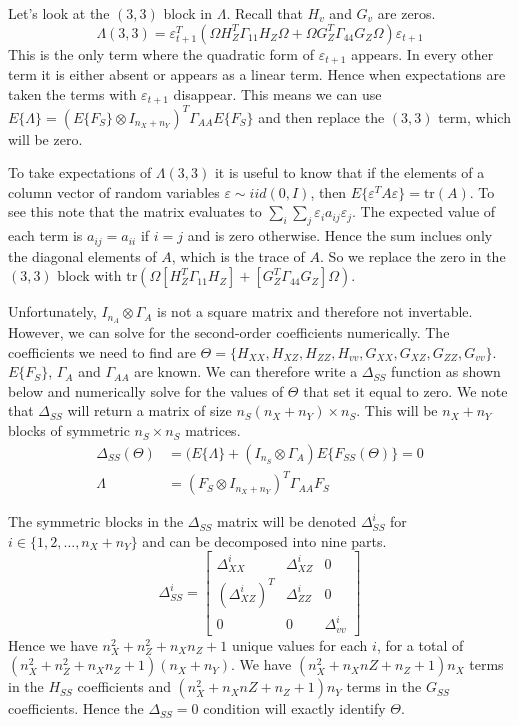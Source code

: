 \documentclass[letterpaper,12pt]{article}
\newcommand{\ve}{\varepsilon}
\theoremstyle{definition}
\begin{document}
\begin{spacing}{1.5}
		Let's look at the $(3,3)$ block in $\Lambda$.  Recall that $H_v$ and $G_v$ are zeros.
		\begin{equation}
			\Lambda(3,3) = \ve_{t+1}^T (\Omega H_Z^T \Gamma_{11} H_Z \Omega + \Omega G_Z^T \Gamma_{44} G_Z \Omega)  \ve_{t+1} \nonumber
		\end{equation}
		This is the only term where the quadratic form of $\ve_{t+1}$ appears.  In every other term it is either absent or appears as a linear term.  Hence when expectations are taken the terms with $\ve_{t+1}$ disappear.  This means we can use $E\{\Lambda\} = (E\{F_S\} \otimes I_{n_X+n_Y})^T \Gamma_{AA} E\{F_S\}$ and then replace the $(3,3)$ term, which will be zero.

		To take expectations of $\Lambda(3,3)$ it is useful to know that if the elements of a column vector of random variables $\ve \sim iid(0,I)$, then $E\{ \ve^T A \ve \} = \text{tr}(A)$.  To see this note that the matrix evaluates to $\sum_i \sum_j \ve_i a_{ij} \ve_j$.  The expected value of each term is $a_{ij} = a_{ii}$ if $i=j$ and is zero otherwise.  Hence the sum inclues only the diagonal elements of $A$, which is the trace of $A$.  So we replace the zero in the $(3,3)$ block with $\text{tr}(\Omega [H_Z^T \Gamma_{11} H_Z] + [G_Z^T \Gamma_{44} G_Z] \Omega)$.
		

		Unfortunately, $I_{n_A} \otimes \Gamma_A$ is not a square matrix and therefore not invertable.  However, we can solve for the second-order coefficients numerically.  The coefficients we need to find are $\Theta = \{ H_{XX}, H_{XZ}, H_{ZZ}, H_{vv}, G_{XX}, G_{XZ}, G_{ZZ}, G_{vv} \}$.  $E\{F_S\}$, $\Gamma_A$ and $\Gamma_{AA}$ are known.  We can therefore write a $\Delta_{SS}$ function as shown below and numerically solve for the values of $\Theta$ that set it equal to zero.  We note that $\Delta_{SS}$ will return a matrix of size $n_S(n_X+n_Y) \times n_S$.  This will be $n_X+n_Y$ blocks of symmetric $n_S \times n_S$ matrices.
		\begin{align}
			\Delta_{SS}(\Theta) & = (E\{\Lambda\} + (I_{n_S} \otimes \Gamma_A) E\{F_{SS}(\Theta)\}  = 0 \nonumber \\
			\Lambda & = (F_S \otimes I_{n_X+n_Y})^T \Gamma_{AA} F_S \nonumber
		\end{align}

		The symmetric blocks in the $\Delta_{SS}$ matrix will be denoted $\Delta^i_{SS}$ for $i \in \{1, 2, \dots, n_X+n_Y\}$ and can be decomposed into nine parts.
		\begin{equation}
			\Delta^i_{SS} = \begin{bmatrix} \Delta^i_{XX} & \Delta^i_{XZ} & 0 \\ (\Delta^i_{XZ})^T & \Delta^i_{ZZ} & 0 \\ 0 & 0 & \Delta^i_{vv}\end{bmatrix}
		\end{equation}
		Hence we have $n_X^2 + n_Z^2 + n_Xn_Z + 1$ unique values for each $i$, for a total of $(n_X^2 + n_Z^2 + n_Xn_Z + 1)(n_X + n_Y)$.  We have $(n_X^2 + n_XnZ + n_Z + 1)n_X$ terms in the $H_{SS}$ coefficients and $(n_X^2 + n_XnZ + n_Z + 1)n_Y$ terms in the $G_{SS}$ coefficients.  Hence the $\Delta_{SS} = 0$ condition will exactly identify $\Theta$.


\end{spacing}
\end{document}
